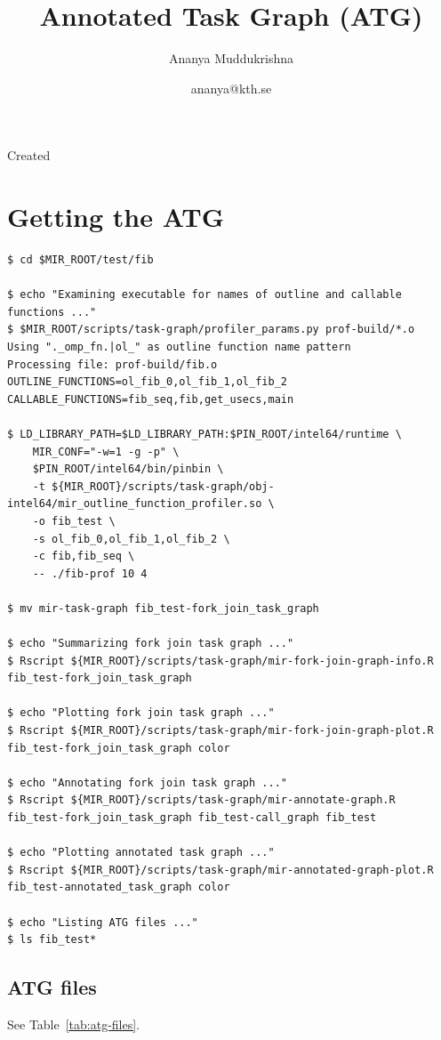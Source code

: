 \documentclass[11pt,a4paper,notitlepage]{article}
\author{Ananya Muddukrishna}
\date{ananya@kth.se}
\title{Annotated Task Graph (ATG)}
\begin{document}
\maketitle

\begin{versionhistory}
 {Created}
\end{versionhistory}

\section{Getting the ATG}

\begin{lstlisting}[style=BashInputStyle]
$ cd $MIR_ROOT/test/fib

$ echo "Examining executable for names of outline and callable functions ..."
$ $MIR_ROOT/scripts/task-graph/profiler_params.py prof-build/*.o
Using "._omp_fn.|ol_" as outline function name pattern
Processing file: prof-build/fib.o
OUTLINE_FUNCTIONS=ol_fib_0,ol_fib_1,ol_fib_2
CALLABLE_FUNCTIONS=fib_seq,fib,get_usecs,main

$ LD_LIBRARY_PATH=$LD_LIBRARY_PATH:$PIN_ROOT/intel64/runtime \
    MIR_CONF="-w=1 -g -p" \
    $PIN_ROOT/intel64/bin/pinbin \
    -t ${MIR_ROOT}/scripts/task-graph/obj-intel64/mir_outline_function_profiler.so \
    -o fib_test \
    -s ol_fib_0,ol_fib_1,ol_fib_2 \
    -c fib,fib_seq \
    -- ./fib-prof 10 4

$ mv mir-task-graph fib_test-fork_join_task_graph

$ echo "Summarizing fork join task graph ..."
$ Rscript ${MIR_ROOT}/scripts/task-graph/mir-fork-join-graph-info.R fib_test-fork_join_task_graph 

$ echo "Plotting fork join task graph ..."
$ Rscript ${MIR_ROOT}/scripts/task-graph/mir-fork-join-graph-plot.R fib_test-fork_join_task_graph color

$ echo "Annotating fork join task graph ..."
$ Rscript ${MIR_ROOT}/scripts/task-graph/mir-annotate-graph.R fib_test-fork_join_task_graph fib_test-call_graph fib_test

$ echo "Plotting annotated task graph ..."
$ Rscript ${MIR_ROOT}/scripts/task-graph/mir-annotated-graph-plot.R fib_test-annotated_task_graph color

$ echo "Listing ATG files ..."
$ ls fib_test*
\end{lstlisting}

\subsection{ATG files}
See Table~\ref{tab:atg-files}.
\end{document}
